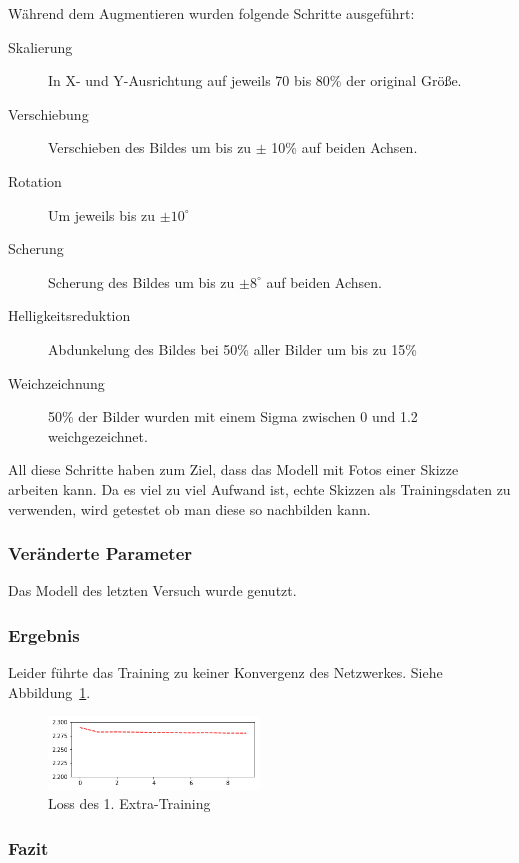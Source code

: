 \documentclass[pdftex,a4paper,halfparskip, article]{scrartcl}
\begin{document}
Während dem Augmentieren wurden folgende Schritte ausgeführt: 
\begin{description}
	\item[Skalierung] In X- und Y-Ausrichtung auf jeweils 70 bis 80\% der original Größe.
	\item[Verschiebung] Verschieben des Bildes um bis zu $\pm$ 10\% auf beiden Achsen.
	\item[Rotation] Um jeweils bis zu $\pm 10^\circ$
	\item[Scherung]  Scherung des Bildes um bis zu $\pm 8^\circ$ auf beiden Achsen.
	\item[Helligkeitsreduktion] Abdunkelung des Bildes bei 50\% aller Bilder um bis zu 15\%
	\item[Weichzeichnung] 50\% der Bilder wurden mit einem Sigma zwischen 0 und 1.2 weichgezeichnet.
\end{description}

All diese Schritte haben zum Ziel, dass das Modell mit Fotos einer Skizze arbeiten kann. Da es viel zu viel Aufwand ist, echte Skizzen als Trainingsdaten zu verwenden, wird getestet ob man diese so nachbilden kann.

\subsubsection*{Veränderte Parameter}

Das Modell des letzten Versuch wurde genutzt.
                 
\subsubsection*{Ergebnis}
   
Leider führte das Training zu keiner Konvergenz des Netzwerkes.
Siehe Abbildung~\ref{fig:loss_drawn_standart}.

\begin{figure}[h]
\centering
\includegraphics[width=0.5\textwidth]{loss_drawn_standart}
\caption{Loss des 1. Extra-Training}
\label{fig:loss_drawn_standart}
\end{figure}


\subsubsection*{Fazit}
\end{document}
